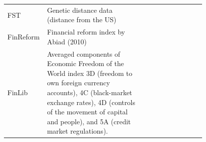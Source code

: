 \documentclass[a4paper,11pt]{article}
\begin{document}
\begin{center}
\begin{longtable}{l p{0.50\linewidth} p{0.3\linewidth}}
			FST & Genetic distance data (distance from the US) & \href{https://sites.tufts.edu/enricospolaore/research/}{\citet{spolaore2009diffusion}} \\
			
			FinReform & Financial reform index by Abiad (2010) & \href{https://www.imf.org/en/Publications/WP/Issues/2016/12/31/A-New-Database-of-Financial-Reforms-22485}{\citet{Abiadetal2008}} \\
			
			FinLib & Averaged components of Economic Freedom of the World index 3D (freedom to own foreign currency accounts), 4C (black-market exchange rates), 4D (controls of the movement of capital and people), and 5A (credit market regulations). & \href{https://www.fraserinstitute.org/economic-freedom/dataset}{\citet{gwartney2017}} \\
			
		\end{longtable}
	\end{center}
\end{document}
